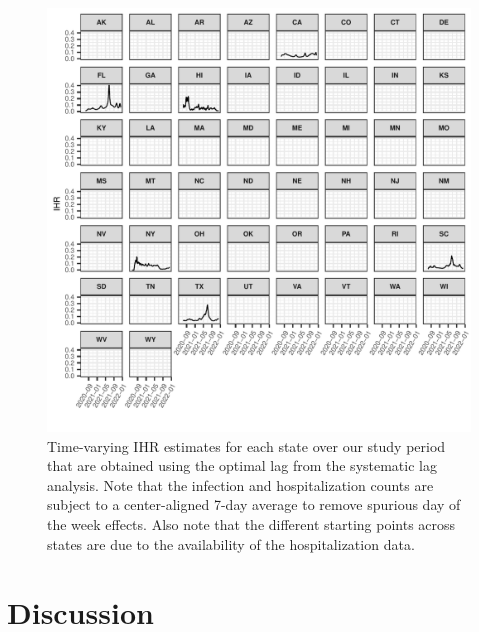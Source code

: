 \documentclass{article}
\newcommand{\attn}[1]{\textcolor{red}{ATTN: #1}}
\begin{document}
\begin{figure}[!tb]
\centering
    \includegraphics[width=.99\textwidth]{IHR_7dav.pdf} 
    \caption{Time-varying IHR estimates for each state over our study period that are obtained using the optimal lag from the systematic lag analysis. Note that the infection and hospitalization counts are subject to a center-aligned 7-day average to remove spurious day of the week effects. Also note that the different starting points across states are due to the availability of the hospitalization data.}
    \label{fig:IHR_7dav}
\end{figure}

\section{Discussion}

\end{document}
